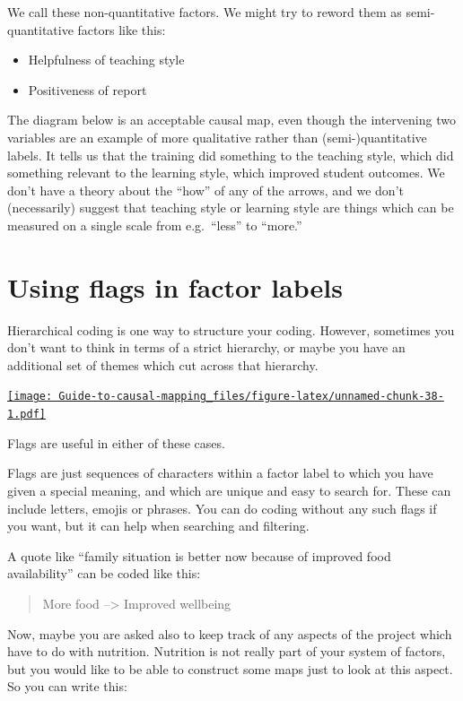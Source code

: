 \documentclass[
]{book}
\providecommand{\tightlist}{%
  \setlength{\itemsep}{0pt}\setlength{\parskip}{0pt}}
\begin{document}
We call these non-quantitative factors. We might try to reword them as semi-quantitative factors like this:

\begin{itemize}
\tightlist
\item
  Helpfulness of teaching style
\item
  Positiveness of report
\end{itemize}

The diagram below is an acceptable causal map, even though the intervening two variables are an example of more qualitative rather than (semi-)quantitative labels. It tells us that the training did something to the teaching style, which did something relevant to the learning style, which improved student outcomes. We don't have a theory about the ``how'' of any of the arrows, and we don't (necessarily) suggest that teaching style or learning style are things which can be measured on a single scale from e.g.~``less'' to ``more.''

\hypertarget{using-flags-in-factor-labels}{%
\section{Using flags in factor labels}\label{using-flags-in-factor-labels}}

Hierarchical coding is one way to structure your coding. However, sometimes you don't want to think in terms of a strict hierarchy, or maybe you have an additional set of themes which cut across that hierarchy.

\href{https://player.vimeo.com/video/671894620}{\texttt{[image: Guide-to-causal-mapping\_files/figure-latex/unnamed-chunk-38-1.pdf]}}

Flags are useful in either of these cases.

Flags are just sequences of characters within a factor label to which you have given a special meaning, and which are unique and easy to search for. These can include letters, emojis or phrases. You can do coding without any such flags if you want, but it can help when searching and filtering.

A quote like ``family situation is better now because of improved food availability'' can be coded like this:

\begin{quote}
More food --\textgreater{} Improved wellbeing
\end{quote}

Now, maybe you are asked also to keep track of any aspects of the project which have to do with nutrition. Nutrition is not really part of your system of factors, but you would like to be able to construct some maps just to look at this aspect. So you can write this:
\end{document}
